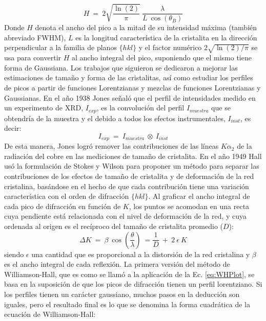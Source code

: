 \begin{equation}
  H \ = \ 2 \sqrt{\frac{\ln(2)}{\pi}} \ \frac{\lambda}{L \ \cos(\theta_B)}
  \label{eq:Scherrer}
\end{equation}
\noindent
Donde $H$ denota el ancho del pico a la mitad de su intensidad máxima (también abreviado FWHM), $L$ es la longitud característica de la cristalita en la dirección perpendicular a la familia de planos $\{hkl\}$ y el factor numérico $2\sqrt{\ln(2)/\pi}$ se usa para convertir $H$ al ancho integral del pico, suponiendo que el mismo tiene forma de Gaussiana.
Los trabajos que siguieron se dedicaron a mejorar las estimaciones de tamaño y forma de las cristalitas, así como estudiar los perfiles de picos a partir de funciones Lorentzianas y mezclas de funciones Lorentzianas y Gaussianas.
En el año 1938 Jones\cite{Jones16} señaló que el perfil de intensidades medido en un experimento de XRD, $I_{exp}$, es la convolución del perfil $I_{muestra}$ que se obtendría de la muestra y el debido a todos los efectos instrumentales, $I_{inst}$, es decir:
\begin{equation}
  I_{exp} \ = \ I_{muestra} \ \otimes \ I_{inst}
  \label{eq:conv}
\end{equation}
\noindent
De esta manera, Jones logró remover las contribuciones de las líneas $K\alpha_2$ de la radiación del cobre en las mediciones de tamaño de cristalita.
En el año 1949 Hall\cite{WHHall1949} usó la formulación de Stokes y Wilson para proponer un método para separar las contribuciones de los efectos de tamaño de cristalita y de deformación de la red cristalina, basándose en el hecho de que cada contribución tiene una variación característica con el orden de difracción $\{hkl\}$.
Al graficar el ancho integral de cada pico de difracción en función de $K$, los puntos se acomodan en una recta cuya pendiente está relacionada con el nivel de deformación de la red, y cuya ordenada al origen es el recíproco del tamaño de cristalita promedio ($D$):
\begin{equation}
  \Delta K \ = \  \beta \ \cos\left(\frac{\theta}{\lambda}\right) \ = \frac{1}{D} \ + \ 2 \ \epsilon \ K
  \label{eq:WHPlot}
\end{equation}
\noindent
siendo $\epsilon$ una cantidad que es proporcional a la distorsión de la red cristalina y $\beta$ es el ancho integral de cada reflexión.
La primera versión del método de Williamson-Hall, que es como se llamó a la aplicación de la Ec. \ref{eq:WHPlot}, se basa en la suposición de que los picos de difracción tienen un perfil lorentziano.
Si los perfiles tienen un carácter gaussiano, muchos pasos en la deducción son iguales, pero el resultado final es lo que se denomina la forma cuadrática de la ecuación de Williamson-Hall\cite{Scardi2004}:
